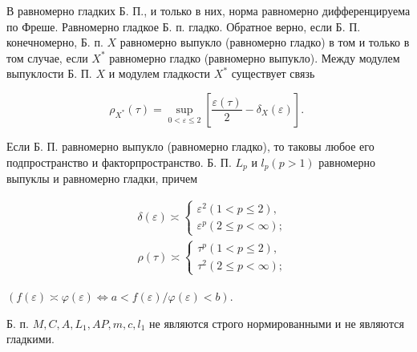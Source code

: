 \documentclass[10pt]{article}
\begin{document}
В равномерно гладких Б. П., и только в них, норма равномерно дифференцируема по Фреше. Равномерно гладкое Б. п. гладко. Обратное верно, если Б. П. конечномерно, Б. п. $X$ равномерно выпукло (равномерно гладко) в том и только в том случае, если $X^{*}$ равномерно гладко (равномерно выпукло). Между модулем выпуклости Б. П. $X$ и модулем гладкости $X^{*}$ существует связь



\[

\rho_{X^{*}}(\tau)=\sup _{0<\varepsilon \leqslant 2}\left[\frac{\varepsilon(\tau)}{2}-\delta_{X}(\varepsilon)\right] \text {. }

\]



Если Б. П. равномерно выпукло (равномерно гладко), то таковы любое его подпространство и факторпространство. Б. П. $L_{p}$ и $l_{p}(p>1)$ равномерно выпуклы и равномерно гладки, причем



\[

\begin{aligned}

& \delta(\varepsilon) \asymp\left\{\begin{array}{l}

\varepsilon^{2}(1<p \leqslant 2), \\

\varepsilon^{p}(2 \leqslant p<\infty) ;

\end{array}\right. \\

& \rho(\tau) \asymp\left\{\begin{array}{l}

\tau^{p}(1<p \leqslant 2), \\

\tau^{2}(2 \leqslant p<\infty) ;

\end{array}\right.

\end{aligned}

\]



$(f(\varepsilon) \asymp \varphi(\varepsilon) \Longleftrightarrow a<f(\varepsilon) / \varphi(\varepsilon)<b)$.



Б. п. $M, C, A, L_{1}, A P, m, c, l_{1}$ не являются строго нормированными и не являются гладкими.
\end{document}
